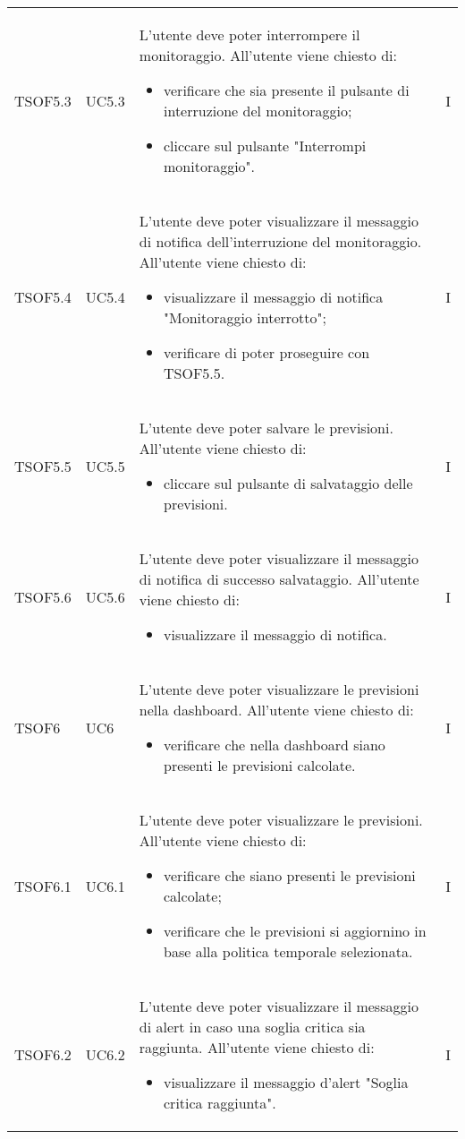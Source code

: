 \begin{longtable}{C{2.5cm} C{2.5cm} L{8cm} C{2cm}}
TSOF5.3 &
UC5.3 &
L'utente deve poter interrompere il monitoraggio. All'utente viene chiesto di:
\begin{itemize}
	\item verificare che sia presente il pulsante di interruzione del monitoraggio;
	\item cliccare sul pulsante "Interrompi monitoraggio".
\end{itemize}&
I \\

TSOF5.4 &
UC5.4 &
L'utente deve poter visualizzare il messaggio di notifica dell'interruzione del monitoraggio. All'utente viene chiesto di:
\begin{itemize}
	\item visualizzare il messaggio di notifica "Monitoraggio interrotto";
	\item verificare di poter proseguire con TSOF5.5.
\end{itemize}&
I \\

TSOF5.5 &
UC5.5 &
L'utente deve poter salvare le previsioni. All'utente viene chiesto di:
\begin{itemize}
	\item cliccare sul pulsante di salvataggio delle previsioni.
\end{itemize}&
I \\

TSOF5.6 &
UC5.6 &
L'utente deve poter visualizzare il messaggio di notifica di successo salvataggio. All'utente viene chiesto di:
\begin{itemize}
	\item visualizzare il messaggio di notifica.
\end{itemize}&
I \\

TSOF6 &
UC6 &
L'utente deve poter visualizzare le previsioni nella dashboard. All'utente viene chiesto di:
\begin{itemize}
	\item verificare che nella dashboard siano presenti le previsioni calcolate.
\end{itemize}&
I \\

TSOF6.1 &
UC6.1 &
L'utente deve poter visualizzare le previsioni. All'utente viene chiesto di:
\begin{itemize}
	\item verificare che siano presenti le previsioni calcolate;
	\item verificare che le previsioni si aggiornino in base alla politica temporale selezionata.
\end{itemize}&
I \\

TSOF6.2 &
UC6.2 &
L'utente deve poter visualizzare il messaggio di alert in caso una soglia critica sia raggiunta. All'utente viene chiesto di:
\begin{itemize}
	\item visualizzare il messaggio d'alert "Soglia critica raggiunta".
\end{itemize}&
I \\

\end{longtable}
\pagebreak
